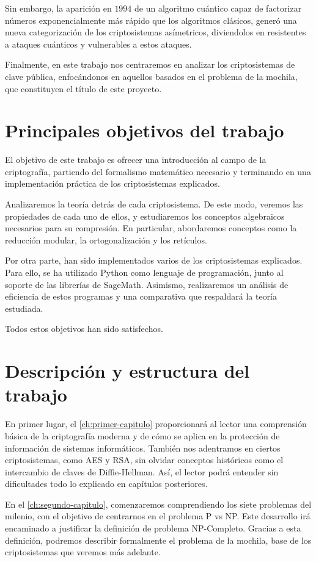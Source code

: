 Sin embargo, la aparición en $1994$ de un algoritmo cuántico capaz de factorizar números exponencialmente más rápido que los algoritmos clásicos, generó una nueva categorización de los criptosistemas asímetricos, diviendolos en resistentes a ataques cuánticos y vulnerables a estos ataques. 

Finalmente, en este trabajo nos centraremos en analizar los criptosistemas de clave pública, enfocándonos en aquellos basados en el problema de la mochila, que constituyen el título de este proyecto.

\section*{Principales objetivos del trabajo}

El objetivo de este trabajo es ofrecer una introducción al campo de la criptografía, partiendo del formalismo matemático necesario y terminando en una implementación práctica de los criptosistemas explicados.

Analizaremos la teoría detrás de cada criptosistema. De este modo, veremos las propiedades de cada uno de ellos, y estudiaremos los conceptos algebraicos necesarios para su compresión. En particular, abordaremos conceptos como la reducción modular, la ortogonalización y los retículos. 

Por otra parte, han sido implementados varios de los criptosistemas explicados. Para ello, se ha utilizado Python como lenguaje de programación, junto al soporte de las librerías de SageMath. Asimismo, realizaremos un análisis de eficiencia de estos programas y una comparativa que respaldará la teoría estudiada.

Todos estos objetivos han sido satisfechos.

\section*{Descripción y estructura del trabajo}

En primer lugar, el \autoref{ch:primer-capitulo} proporcionará al lector una comprensión básica de la criptografía moderna y de cómo se aplica en la protección de información de sistemas informáticos. También nos adentramos en ciertos criptosistemas, como AES y RSA, sin olvidar conceptos históricos como el intercambio de claves de Diffie-Hellman. Así, el lector podrá entender sin dificultades todo lo explicado en capítulos posteriores.

En el \autoref{ch:segundo-capitulo}, comenzaremos comprendiendo los siete problemas del milenio, con el objetivo de centrarnos en el problema P vs NP. Este desarrollo irá encaminado a justificar la definición de problema NP-Completo. Gracias a esta definición, podremos describir formalmente el problema de la mochila, base de los criptosistemas que veremos más adelante. 

